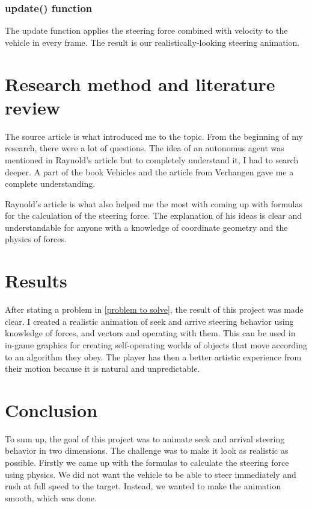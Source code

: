 \documentclass[10pt,twoside,english,a4paper]{article}
\begin{document}
\subsubsection{update() function} \label{updatef} 

The update function applies the steering force combined with velocity to the vehicle
in every frame. The result is our realistically-looking steering animation. 

\section{Research method and literature review} \label{research method} 

The source article \cite{Raynolds} is what introduced me to the topic. 
From the beginning of my research, there were a lot of questions. 
The idea of an autonomus agent was mentioned in Raynold's article
but to completely understand it, I had to search deeper. A part of the book Vehicles 
\cite{Braitenberg} and the article from Verhangen \cite{Verhagen} gave me a complete
understanding. 

Raynold's article is what also helped me the most with coming up with formulas for
the calculation of the steering force. The explanation of his ideas is clear and 
understandable for anyone with a knowledge of coordinate geometry 
and the physics of forces. 

\section{Results} \label{results} 

After stating a problem in \ref{problem to solve}, the result of this 
project was made clear. I created a realistic animation of seek and arrive
steering behavior using knowledge of forces, and vectors and operating with them. 
This can be used in in-game graphics for creating self-operating worlds
of objects that move according to an algorithm they obey. The player 
has then a better artistic experience from their motion because it is 
natural and unpredictable.  

\section{Conclusion} \label{conclusion}

To sum up, the goal of this project was to animate seek and arrival 
steering behavior in two dimensions. The challenge was to 
make it look as realistic as possible. Firstly we came
up with the formulas to calculate the steering force using 
physics. We did not want the vehicle to be able to 
steer immediately and rush at full speed to the target. Instead, 
we wanted to make the animation smooth, which was done. 
\end{document}
